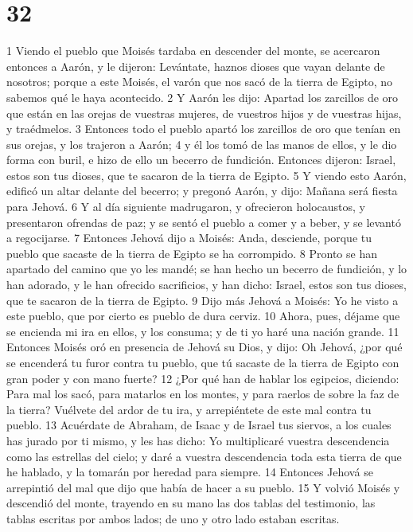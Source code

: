 \chapter{32}

1 Viendo el pueblo que Moisés tardaba en descender del monte, se acercaron entonces a Aarón, y le dijeron: Levántate, haznos dioses que vayan delante de nosotros; porque a este Moisés, el varón que nos sacó de la tierra de Egipto, no sabemos qué le haya acontecido.
2 Y Aarón les dijo: Apartad los zarcillos de oro que están en las orejas de vuestras mujeres, de vuestros hijos y de vuestras hijas, y traédmelos.
3 Entonces todo el pueblo apartó los zarcillos de oro que tenían en sus orejas, y los trajeron a Aarón;
4 y él los tomó de las manos de ellos, y le dio forma con buril, e hizo de ello un becerro de fundición. Entonces dijeron: Israel, estos son tus dioses, que te sacaron de la tierra de Egipto.
5 Y viendo esto Aarón, edificó un altar delante del becerro; y pregonó Aarón, y dijo: Mañana será fiesta para Jehová.
6 Y al día siguiente madrugaron, y ofrecieron holocaustos, y presentaron ofrendas de paz; y se sentó el pueblo a comer y a beber, y se levantó a regocijarse.
7 Entonces Jehová dijo a Moisés: Anda, desciende, porque tu pueblo que sacaste de la tierra de Egipto se ha corrompido.
8 Pronto se han apartado del camino que yo les mandé; se han hecho un becerro de fundición, y lo han adorado, y le han ofrecido sacrificios, y han dicho: Israel, estos son tus dioses, que te sacaron de la tierra de Egipto.
9 Dijo más Jehová a Moisés: Yo he visto a este pueblo, que por cierto es pueblo de dura cerviz.
10 Ahora, pues, déjame que se encienda mi ira en ellos, y los consuma; y de ti yo haré una nación grande.
11 Entonces Moisés oró en presencia de Jehová su Dios, y dijo: Oh Jehová, ¿por qué se encenderá tu furor contra tu pueblo, que tú sacaste de la tierra de Egipto con gran poder y con mano fuerte?
12 ¿Por qué han de hablar los egipcios, diciendo: Para mal los sacó, para matarlos en los montes, y para raerlos de sobre la faz de la tierra? Vuélvete del ardor de tu ira, y arrepiéntete de este mal contra tu pueblo.
13 Acuérdate de Abraham, de Isaac y de Israel tus siervos, a los cuales has jurado por ti mismo, y les has dicho: Yo multiplicaré vuestra descendencia como las estrellas del cielo; y daré a vuestra descendencia toda esta tierra de que he hablado, y la tomarán por heredad para siempre.
14 Entonces Jehová se arrepintió del mal que dijo que había de hacer a su pueblo.
15 Y volvió Moisés y descendió del monte, trayendo en su mano las dos tablas del testimonio, las tablas escritas por ambos lados; de uno y otro lado estaban escritas.
